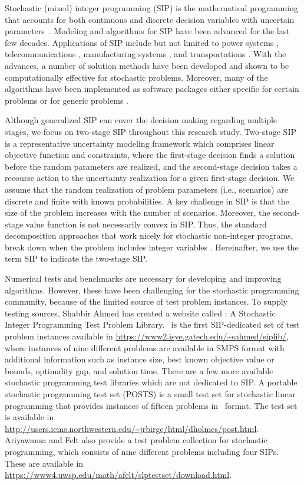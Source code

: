 Stochastic (mixed) integer programming (SIP) is the mathematical programming that accounts for 
both continuous and discrete decision variables with uncertain parameters~\cite{book:BL2011}. 
Modeling and algorithms for SIP have been advanced for the last few decades. Applications of SIP include but not limited to power systems \cite{journal:PO2013,journal:KYZC2017}, telecommunications \cite{journal:SDC1994}, manufacturing systems \cite{journal:SPR1994,journal:AG2004}, and transportations \cite{journal:MW1969,journal:PGM2017,journal:TPP2017,journal:MPT2014}. With the advances, a number of solution methods have been developed and shown to be computationally effective for stochastic problems. Moreover, many of the algorithms have been implemented as software packages either specific for certain problems or for generic problems \cite{SCIP,journal:WWH2012,journal:KZ2015}.

Although generalized SIP can cover the decision making regarding multiple stages, we focus on two-stage SIP throughout this research study. Two-stage SIP is a representative uncertainty modeling framework which comprises linear objective function and constraints, where the first-stage decision finds a solution before the 
random parameters are realized, and the second-stage decision takes a recourse action to the uncertainty realization for a given first-stage decision. We assume that the random realization of problem parameters (i.e., scenarios) are discrete and finite with known probabilities.
A key challenge in SIP is that the size of
the problem increases with the number of scenarios. Moreover, the 
second-stage value function is not necessarily convex in SIP. Thus, the standard decomposition 
approaches that work nicely for stochastic non-integer programs, break down when the problem includes integer variables \cite{journal:AG2004}. Hereinafter, we use the 
term SIP to indicate the two-stage SIP. 

Numerical tests and benchmarks are necessary for developing and improving algorithms. However,
these have been challenging for the stochastic programming community, because of the limited source of test problem instances. To supply testing sources, Shabbir Ahmed has created a website called \siplib: A Stochastic Integer Programming Test Problem Library.
\siplib\ is the first SIP-dedicated set of test problem instances available in \url{https://www2.isye.gatech.edu/~sahmed/siplib/}, where instances of nine different problems are available in SMPS format \cite{smps} with additional information such as instance size, best known objective value or bounds, optimality gap, and solution time. There are a few more available stochastic programming test libraries which are not dedicated to SIP.
A portable stochastic programming test set (POSTS) \cite{POSTS} is a small test set for 
stochastic linear programming that provides instances of fifteen problems in \smps\ format. The test set is available in \url{http://users.iems.northwestern.edu/~jrbirge/html/dholmes/post.html}. Ariyawansa and Felt \cite{journal:AF2004} also provide a test problem collection for stochastic programming, which consists of nine different problems including four SIPs. These are available in \url{https://www4.uwsp.edu/math/afelt/slptestset/download.html}. 

